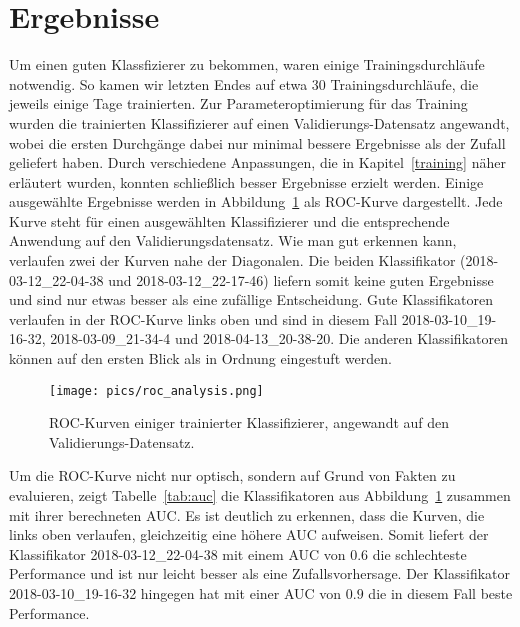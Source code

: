 \section{Ergebnisse}

Um einen guten Klassfizierer zu bekommen, waren einige Trainingsdurchläufe notwendig. So kamen wir letzten Endes auf etwa 30 Trainingsdurchläufe, die jeweils einige Tage trainierten. Zur Parameteroptimierung für das Training wurden die trainierten Klassifizierer auf einen Validierungs-Datensatz angewandt, wobei die ersten Durchgänge dabei nur minimal bessere Ergebnisse als der Zufall geliefert haben. Durch verschiedene Anpassungen, die in Kapitel~\ref{training} näher erläutert wurden, konnten schließlich besser Ergebnisse erzielt werden. Einige ausgewählte Ergebnisse werden in Abbildung~\ref{fig:roc} als ROC-Kurve dargestellt. Jede Kurve steht für einen ausgewählten Klassifizierer und die entsprechende Anwendung auf den Validierungsdatensatz. Wie man gut erkennen kann, verlaufen zwei der Kurven nahe der Diagonalen. Die beiden Klassifikator (2018-03-12\_22-04-38 und 2018-03-12\_22-17-46) liefern somit keine guten Ergebnisse und sind nur etwas besser als eine zufällige Entscheidung. Gute Klassifikatoren verlaufen in der ROC-Kurve links oben und sind in diesem Fall 2018-03-10\_19-16-32, 2018-03-09\_21-34-4 und 2018-04-13\_20-38-20. Die anderen Klassifikatoren können auf den ersten Blick als in Ordnung eingestuft werden.

\begin{figure}[htb!]
	\begin{center}
		\texttt{[image: pics/roc\_analysis.png]}
		\caption{ROC-Kurven einiger trainierter Klassifizierer, angewandt auf den Validierungs-Datensatz.}
		\label{fig:roc}
    \end{center}
\end{figure}

Um die ROC-Kurve nicht nur optisch, sondern auf Grund von Fakten zu evaluieren, zeigt Tabelle~\ref{tab:auc} die Klassifikatoren aus Abbildung~\ref{fig:roc} zusammen mit ihrer berechneten AUC. Es ist deutlich zu erkennen, dass die Kurven, die links oben verlaufen, gleichzeitig eine höhere AUC aufweisen. Somit liefert der Klassifikator 2018-03-12\_22-04-38 mit einem AUC von $0.6$ die schlechteste Performance und ist nur leicht besser als eine Zufallsvorhersage. Der Klassifikator 2018-03-10\_19-16-32 hingegen hat mit einer AUC von $0.9$ die in diesem Fall beste Performance. 

